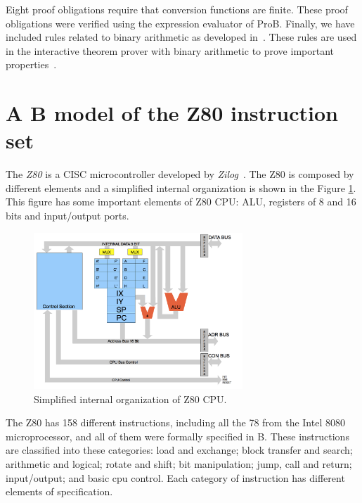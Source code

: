 \documentclass[a4paper]{llncs}
\begin{document}
Eight proof obligations require that conversion functions are finite. %
 These proof obligations were verified using the expression evaluator of ProB.
Finally, we have included rules related to binary arithmetic as developed
in~\cite{Leibnizens}. These rules are used in the interactive theorem prover with
binary arithmetic to prove important properties~\cite{James2010,Dasgupta2006}.



\section{A B model of the Z80 instruction set}
\label{sec:z80}

The \textit{Z80} is a CISC microcontroller developed by
\textit{Zilog}~\cite{Z80_manual}. The Z80 is composed by different
elements and a simplified internal organization is shown in the Figure
\ref{fig:DiagramBlock}.  This figure has some important elements of
Z80 CPU: ALU, registers of 8 and 16 bits and input/output ports.

\begin{figure}[h] \centering
\includegraphics[width=0.70\textwidth]{images/Architecture.png}
\caption{Simplified internal organization of Z80 CPU.}
\label{fig:DiagramBlock}
\end{figure}


The Z80 has 158 different instructions, including all the 78 from the Intel 8080
microprocessor, and all of them were formally specified in B. These instructions are classified
into these categories: load and exchange; block transfer and search; arithmetic
and logical; rotate and shift; bit manipulation; jump, call and return;
input/output; and basic cpu control. Each category of instruction has different
elements of specification.
\end{document}
